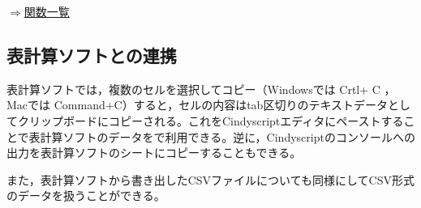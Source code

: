 \documentclass[papersize,a4paper,12pt,uplatex]{jsarticle}
\begin{document}
\begin{flushright}\hyperlink{functionlist}{$\Rightarrow$関数一覧}\end{flushright}

\subsection{表計算ソフトとの連携}
表計算ソフトでは，複数のセルを選択してコピー（Windowsでは Crtl+ C ，Macでは Command+C）すると，セルの内容はtab区切りのテキストデータとしてクリップボードにコピーされる。これをCindyscriptエディタにペーストすることで表計算ソフトのデータを\ketcindy で利用できる。逆に，Cindyscriptのコンソールへの出力を表計算ソフトのシートにコピーすることもできる。

また，表計算ソフトから書き出したCSVファイルについても同様にしてCSV形式のデータを扱うことができる。
\end{document}
